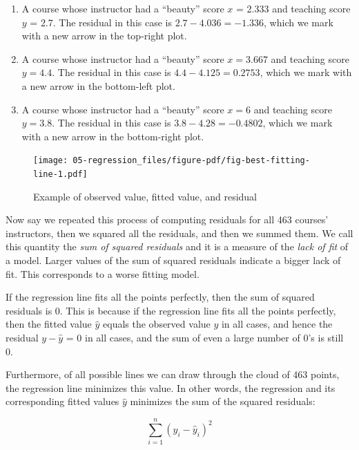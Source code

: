 \documentclass[
  letterpaper,
  DIV=11,
  numbers=noendperiod]{scrreprt}
\theoremstyle{definition}
\theoremstyle{remark}
\begin{document}
\begin{enumerate}
\def\labelenumi{\arabic{enumi}.}
\item
  A course whose instructor had a ``beauty'' score \(x\) = 2.333 and
  teaching score \(y\) = 2.7. The residual in this case is
  \(2.7 - 4.036 = -1.336\), which we mark with a new arrow in the
  top-right plot.
\item
  A course whose instructor had a ``beauty'' score \(x = 3.667\) and
  teaching score \(y = 4.4\). The residual in this case is
  \(4.4 - 4.125 = 0.2753\), which we mark with a new arrow in the
  bottom-left plot.
\item
  A course whose instructor had a ``beauty'' score \(x = 6\) and
  teaching score \(y = 3.8\). The residual in this case is
  \(3.8 - 4.28 = -0.4802\), which we mark with a new arrow in the
  bottom-right plot.
\end{enumerate}

\begin{figure}

{\centering \texttt{[image: 05-regression\_files/figure-pdf/fig-best-fitting-line-1.pdf]}

}

\caption{\label{fig-best-fitting-line}Example of observed value, fitted
value, and residual}

\end{figure}

Now say we repeated this process of computing residuals for all 463
courses' instructors, then we squared all the residuals, and then we
summed them. We call this quantity the \emph{sum of squared residuals}
and it is a measure of the \emph{lack of fit} of a model. Larger values
of the sum of squared residuals indicate a bigger lack of fit. This
corresponds to a worse fitting model.

If the regression line fits all the points perfectly, then the sum of
squared residuals is 0. This is because if the regression line fits all
the points perfectly, then the fitted value \(\widehat{y}\) equals the
observed value \(y\) in all cases, and hence the residual
\(y-\widehat{y}\) = 0 in all cases, and the sum of even a large number
of 0's is still 0.

Furthermore, of all possible lines we can draw through the cloud of 463
points, the regression line minimizes this value. In other words, the
regression and its corresponding fitted values \(\widehat{y}\) minimizes
the sum of the squared residuals:

\[
\sum_{i=1}^{n}(y_i - \widehat{y}_i)^2
\]
\end{document}
